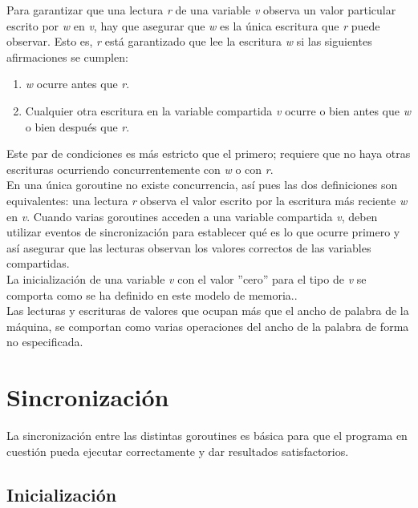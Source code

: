 Para garantizar que una lectura \textit{r} de una variable \textit{v} observa un
valor particular escrito por \textit{w} en \textit{v}, hay que asegurar que
\textit{w} es la única escritura que \textit{r} puede observar. Esto es,
\textit{r} está garantizado que lee la escritura \textit{w} si las siguientes
afirmaciones se cumplen:

\begin{enumerate} \item \textit{w} ocurre antes que \textit{r}.  \item Cualquier
otra escritura en la variable compartida \textit{v} ocurre o bien antes que
\textit{w} o bien después que \textit{r}.  \end{enumerate}

Este par de condiciones es más estricto que el primero; requiere que no haya
otras escrituras ocurriendo concurrentemente con \textit{w} o con \textit{r}.\\

En una única goroutine no existe concurrencia, así pues las dos definiciones son
equivalentes: una lectura \textit{r} observa el valor escrito por la escritura
más reciente \textit{w} en \textit{v}. Cuando varias goroutines acceden a una
variable compartida \textit{v}, deben utilizar eventos de sincronización para
establecer qué es lo que ocurre primero y así asegurar que las lecturas observan
los valores correctos de las variables compartidas.\\

La inicialización de una variable \textit{v} con el valor ''cero'' para el tipo
de \textit{v} se comporta como se ha definido en este modelo de memoria..\\

Las lecturas y escrituras de valores que ocupan más que el ancho de palabra de
la máquina, se comportan como varias operaciones del ancho de la palabra de
forma no especificada.

\section{Sincronización}

La sincronización entre las distintas goroutines es básica para que el programa
en cuestión pueda ejecutar correctamente y dar resultados satisfactorios.

	\subsection{Inicialización}
	

